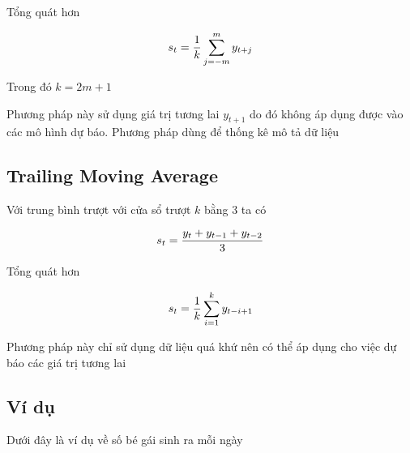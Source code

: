 \documentclass[
]{book}
\begin{document}
Tổng quát hơn

\[\begin{align}
\Large s_{t} = \frac{1}{k}  \sum_{j=-m}^{m}{y_{t+j}}
\end{align}\]

Trong đó \(k = 2m + 1\)

Phương pháp này sử dụng giá trị tương lai \(y_{t+1}\) do đó không áp dụng được vào các mô hình dự báo. Phương pháp dùng để thống kê mô tả dữ liệu

\hypertarget{trailing-moving-average}{%
\subsection{Trailing Moving Average}\label{trailing-moving-average}}

Với trung bình trượt với cửa sổ trượt \(k\) bằng 3 ta có

\[\begin{align}
\Large s_{t} = \frac{y_{t} + y_{t - 1} + y_{t - 2}}{3}
\end{align}\]

Tổng quát hơn

\[\begin{align}
\Large s_{t} = \frac{1}{k} \sum^{k}_{i=1}{y_{t-i+1}}
\end{align}\]

Phương pháp này chỉ sử dụng dữ liệu quá khứ nên có thể áp dụng cho việc dự báo các giá trị tương lai

\hypertarget{vuxed-dux1ee5}{%
\subsection{Ví dụ}\label{vuxed-dux1ee5}}

Dưới đây là ví dụ về số bé gái sinh ra mỗi ngày
\end{document}
